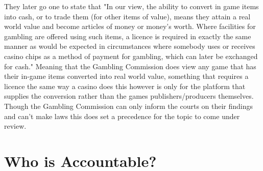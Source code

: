 \documentclass{scrartcl}
\begin{document}
They later go one to state that "In our view, the ability to convert in game items into cash, or to trade them (for other items of value), means they attain a real world value and become articles of money or money’s worth. Where facilities for gambling are offered using such items, a licence is required in exactly the same manner as would be expected in circumstances where somebody uses or receives casino chips as a method of payment for gambling, which can later be exchanged for cash." Meaning that the Gambling Commission does view any game that has their in-game items converted into real world value, something that requires a licence the same way a casino does this however is only for the platform that supplies the conversion rather than the games publishers/producers themselves. Though the Gambling Commission can only inform the courts on their findings and can't make laws this does set a precedence for the topic to come under review.

\section{Who is Accountable?}




\end{document}
